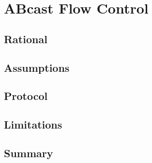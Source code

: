 \chapter{ABcast Flow Control}

    \graphicspath{{Chapter6-FlowControl/Figs/Vector/}{Chapter6-FlowControl/Figs/}}


\section{Rational}

\section{Assumptions}


\section{Protocol}

\section{Limitations}

\section{Summary}